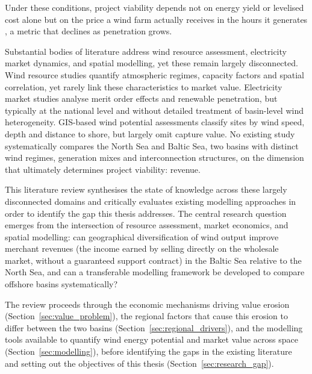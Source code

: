 \vspace{4pt}

Under these conditions, project viability depends not on energy yield or levelised cost alone but on the price a wind farm actually receives in the hours it generates \cite{Hirth2013}, a metric that declines as penetration grows.

\vspace{4pt}

Substantial bodies of literature address wind resource assessment, electricity market dynamics, and spatial modelling, yet these remain largely disconnected. Wind resource studies quantify atmospheric regimes, capacity factors and spatial correlation, yet rarely link these characteristics to market value. Electricity market studies analyse merit order effects and renewable penetration, but typically at the national level and without detailed treatment of basin-level wind heterogeneity. GIS-based wind potential assessments classify sites by wind speed, depth and distance to shore, but largely omit capture value. No existing study systematically compares the North Sea and Baltic Sea, two basins with distinct wind regimes, generation mixes and interconnection structures, on the dimension that ultimately determines project viability: revenue.

\vspace{4pt}

This literature review synthesises the state of knowledge across these largely disconnected domains and critically evaluates existing modelling approaches in order to identify the gap this thesis addresses. The central research question emerges from the intersection of resource assessment, market economics, and spatial modelling: can geographical diversification of wind output improve merchant revenues (the income earned by selling directly on the wholesale market, without a guaranteed support contract) in the Baltic Sea relative to the North Sea, and can a transferable modelling framework be developed to compare offshore basins systematically?

\vspace{4pt}

The review proceeds through the economic mechanisms driving value erosion (Section~\ref{sec:value_problem}), the regional factors that cause this erosion to differ between the two basins (Section~\ref{sec:regional_drivers}), and the modelling tools available to quantify wind energy potential and market value across space (Section~\ref{sec:modelling}), before identifying the gaps in the existing literature and setting out the objectives of this thesis (Section~\ref{sec:research_gap}).
